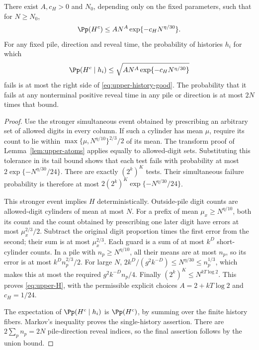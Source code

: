 \begin{lemma}\label{lem:upper-history-good}
There exist $A,c_H>0$ and $N_0$, depending only on the fixed
parameters, such that for $N\ge N_0$,
\begin{equation}\label{eq:upper-H}
 \Pp(H^c)\le AN^A\exp\{-c_H N^{\eta/30}\}.
\end{equation}
For any fixed pile, direction and reveal time, the probability of
histories $h_i$ for which
\begin{equation}\label{eq:upper-history-good}
 \Pp(H^c\mid h_i)\le
          \sqrt{AN^A\exp\{-c_H N^{\eta/30}\}}
\end{equation}
fails is at most the right side of \eqref{eq:upper-history-good}.
The probability that it fails at any nonterminal positive reveal
time in any pile or direction is at most $2N$ times that bound.
\end{lemma}
\begin{proof}
Use the stronger simultaneous event obtained by prescribing an
arbitrary set of allowed digits in every column. If such a cylinder
has mean $\mu$, require its count to lie within
$\max\{\mu,N^{\eta/10}\}^{2/3}/2$ of its mean.
The transform proof of Lemma~\ref{lem:upper-atoms} applies equally
to allowed-digit sets. Substituting this tolerance in its tail
bound shows that each test fails with probability at most
$2\exp\{-N^{\eta/30}/24\}$.
There are exactly $(2^k)^K$ tests. Their simultaneous failure
probability is therefore at most
$2(2^k)^K\exp\{-N^{\eta/30}/24\}$.

This stronger event implies $H$ deterministically. Outside-pile
digit counts are allowed-digit cylinders of mean at most $N$.
For a prefix of mean $\mu_x\ge N^{\eta/10}$, both its count and
the count obtained by prescribing one later digit have errors at
most $\mu_x^{2/3}/2$. Subtract the original digit proportion times
the first error from the second; their sum is at most
$\mu_x^{2/3}$. Each guard is a sum of at most $k^D$ short-cylinder
counts. In a pile with $n_p\ge N^{\eta/10}$, all their means are
at most $n_p$, so its error is at most $k^D n_p^{2/3}/2$.
For large $N$,
$2k^D/(g^2k^{-D})\le N^{\eta/30}\le n_p^{1/3}$,
which makes this at most the required $g^2k^{-D}n_p/4$.
Finally $(2^k)^K\le N^{kT\log2}$. This proves
\eqref{eq:upper-H}, with the permissible explicit choices
$A=2+kT\log2$ and $c_H=1/24$.

The expectation of $\Pp(H^c\mid h_i)$ is $\Pp(H^c)$, by summing
over the finite history fibers. Markov's inequality proves the
single-history assertion. There are $2\sum_p n_p=2N$ pile-direction
reveal indices, so the final assertion follows by the union bound.
\end{proof}

